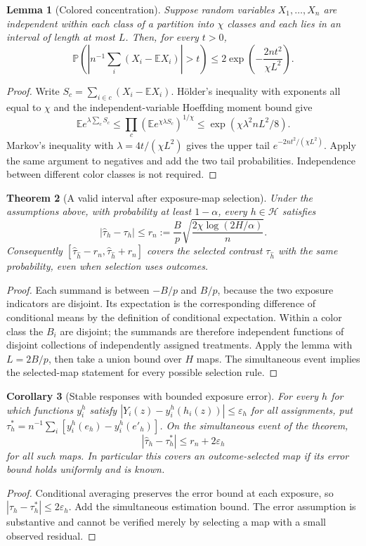 \documentclass[11pt,a4paper]{article}
\newtheorem{theorem}{Theorem}
\newtheorem{lemma}[theorem]{Lemma}
\newtheorem{corollary}[theorem]{Corollary}
\newcommand{\E}{\mathbb E}
\newcommand{\Prb}{\mathbb P}
\begin{document}
\begin{lemma}[Colored concentration]
Suppose random variables $X_1,\ldots,X_n$ are independent within each class of a partition into $\chi$ classes and each lies in an interval of length at most $L$. Then, for every $t>0$,
\[
 \Prb\left(\left|n^{-1}\sum_i(X_i-\E X_i)\right|>t\right)
 \leq2\exp\left(-\frac{2nt^2}{\chi L^2}\right).
\]
\end{lemma}
\begin{proof}
Write $S_c=\sum_{i\in c}(X_i-\E X_i)$. H\"older's inequality with exponents all equal to $\chi$ and the independent-variable Hoeffding moment bound give
\[
 \E e^{\lambda\sum_cS_c}
 \leq\prod_c(\E e^{\chi\lambda S_c})^{1/\chi}
 \leq\exp(\chi\lambda^2 nL^2/8).
\]
Markov's inequality with $\lambda=4t/(\chi L^2)$ gives the upper tail $e^{-2nt^2/(\chi L^2)}$. Apply the same argument to negatives and add the two tail probabilities. Independence between different color classes is not required.
\end{proof}

\begin{theorem}[A valid interval after exposure-map selection]
Under the assumptions above, with probability at least $1-\alpha$, every $h\in\mathcal H$ satisfies
\[
 |\widehat\tau_h-\tau_h|\leq
 r_n:=\frac{B}{p}\sqrt{\frac{2\chi\log(2H/\alpha)}n}.
\]
Consequently $[\widehat\tau_{\widehat h}-r_n,\widehat\tau_{\widehat h}+r_n]$ covers the selected contrast $\tau_{\widehat h}$ with the same probability, even when selection uses outcomes.
\end{theorem}
\begin{proof}
Each summand is between $-B/p$ and $B/p$, because the two exposure indicators are disjoint. Its expectation is the corresponding difference of conditional means by the definition of conditional expectation. Within a color class the $B_i$ are disjoint; the summands are therefore independent functions of disjoint collections of independently assigned treatments. Apply the lemma with $L=2B/p$, then take a union bound over $H$ maps. The simultaneous event implies the selected-map statement for every possible selection rule.
\end{proof}

\begin{corollary}[Stable responses with bounded exposure error]
For every $h$ for which functions $y_i^h$ satisfy
$|Y_i(z)-y_i^h(h_i(z))|\leq\varepsilon_h$ for all assignments, put
$\tau_h^*=n^{-1}\sum_i[y_i^h(e_h)-y_i^h(e'_h)]$.
On the simultaneous event of the theorem,
\[
 |\widehat\tau_h-\tau_h^*|\leq r_n+2\varepsilon_h
\]
for all such maps. In particular this covers an outcome-selected map if its error bound holds uniformly and is known.
\end{corollary}
\begin{proof}
Conditional averaging preserves the error bound at each exposure, so $|\tau_h-\tau_h^*|\leq2\varepsilon_h$. Add the simultaneous estimation bound. The error assumption is substantive and cannot be verified merely by selecting a map with a small observed residual.
\end{proof}
\end{document}

